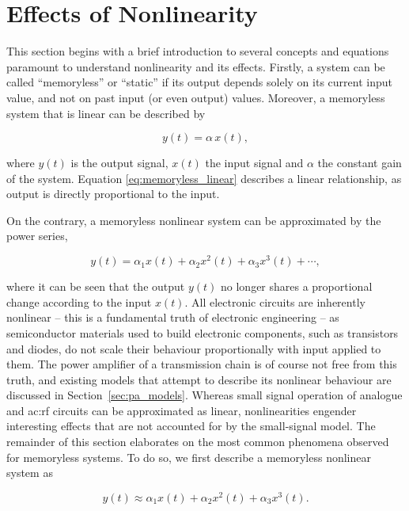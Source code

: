 \section{Effects of Nonlinearity}\label{sec:nonlinearity_effects}

This section begins with a brief introduction to several concepts and equations paramount to understand nonlinearity and its effects. Firstly, a system can be called ``memoryless'' or ``static'' if its output depends solely on its current input value, and not on past input (or even output) values. Moreover, a memoryless system that is linear can be described by \cite{razavi}

\begin{equation}
  y(t) = \alpha \, x(t),
  \label{eq:memoryless_linear}
\end{equation}

where $y(t)$ is the output signal, $x(t)$ the input signal and $\alpha$ the constant gain of the system. Equation \eqref{eq:memoryless_linear} describes a linear relationship, as output is directly proportional to the input. 

On the contrary, a memoryless nonlinear system can be approximated by the power series, \cite{razavi}

\begin{equation}
  y(t) = \alpha_1 x(t) + \alpha_2 x^2(t) + \alpha_3 x^3(t) + \dotsb, 
  \label{eq:power_series}
\end{equation}

where it can be seen that the output $y(t)$ no longer shares a proportional change according to the input $x(t)$.  All electronic circuits are inherently nonlinear -- this is a fundamental truth of electronic engineering \cite{maas} -- as semiconductor materials used to build electronic components, such as transistors and diodes, do not scale their behaviour proportionally with input applied to them. The power amplifier of a transmission chain is of course not free from this truth, and existing models that attempt to describe its nonlinear behaviour are discussed in Section~\ref{sec:pa_models}. Whereas small signal operation of analogue and \gls{ac:rf} circuits can be approximated as linear, nonlinearities engender interesting effects that are not accounted for by the small-signal model. The remainder of this section elaborates on the most common phenomena observed for memoryless systems. To do so, we first describe a memoryless nonlinear system as \cite{razavi}

\begin{equation}
  y(t) \approx \alpha_1 x(t) + \alpha_2 x^2(t) + \alpha_3 x^3(t).
  \label{eq:memoryless_nonlinear}
\end{equation}


